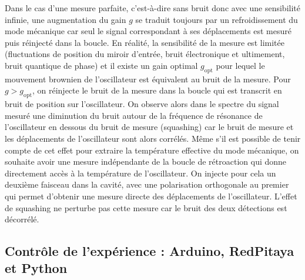 \documentclass[12pt,a4paper]{article}
\begin{document}
Dans le cas d'une mesure parfaite, c'est-à-dire sans bruit donc avec une sensibilité infinie, une augmentation du gain $g$ se traduit toujours par un refroidissement du mode mécanique car seul le signal correspondant à ses déplacements est mesuré puis réinjecté dans la boucle.
En réalité, la sensibilité de la mesure est limitée (fluctuations de position du miroir d'entrée, bruit électronique et ultimement, bruit quantique de phase) et il existe un gain optimal $g_\mathrm{opt}$ pour lequel le mouvement brownien de l'oscillateur est équivalent au bruit de la mesure.
Pour $g>g_\mathrm{opt}$, on réinjecte le bruit de la mesure dans la boucle qui est transcrit en bruit de position sur l'oscillateur.
On observe alors dans le spectre du signal mesuré une diminution du bruit autour de la fréquence de résonance de l'oscillateur en dessous du bruit de mesure (squashing) car le bruit de mesure et les déplacements de l'oscillateur sont alors corrélés.
Même s'il est possible de tenir compte de cet effet pour extraire la température effective du mode mécanique, on souhaite avoir une mesure indépendante de la boucle de rétroaction qui donne directement accès à la température de l'oscillateur.
On injecte pour cela un deuxième faisceau dans la cavité, avec une polarisation orthogonale au premier qui permet d'obtenir une mesure directe des déplacements de l'oscillateur.
L'effet de squashing ne perturbe pas cette mesure car le bruit des deux détections est décorrélé.

\subsection{Contrôle de l'expérience : Arduino, RedPitaya et Python}
\end{document}
